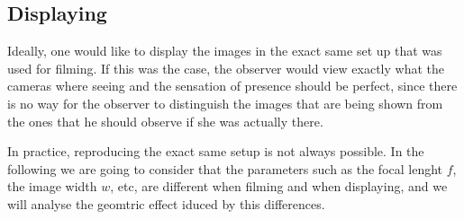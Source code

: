 \documentclass[12pt,a4paper]{article}
\begin{document}
\subsection{Displaying}
Ideally, one would like to display the images in the exact same set up that was used for filming.  If this was the case, the observer would view exactly what the cameras where seeing and the sensation of presence should be perfect, since there is no way for the observer to distinguish the images that are being shown from the ones that he should observe if she was actually there.

In practice, reproducing the exact same setup is not always possible.  In the following we are going to consider that the parameters such as the focal lenght $f$, the image width $w$, etc, are different when filming and when displaying, and we will analyse the geomtric effect iduced by this differences.
\end{document}
